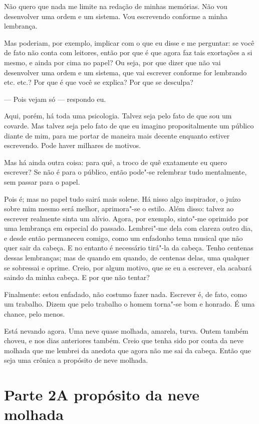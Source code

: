 Não quero que nada me limite na redação de minhas memórias. Não vou
desenvolver uma ordem e um sistema. Vou escrevendo conforme a minha lembrança.

Mas poderiam, por exemplo, implicar com o que eu disse e me perguntar:
se você de fato não conta com leitores, então por que é que agora faz
tais exortações a si mesmo, e ainda por cima no papel? Ou seja, por que
dizer que não vai desenvolver uma ordem e um sistema, que vai escrever
conforme for lembrando etc. etc.? Por que é que você se explica? Por que se
desculpa?

--- Pois vejam só --- respondo eu.

Aqui, porém, há toda uma psicologia. Talvez seja pelo fato de que sou um
covarde. Mas talvez seja pelo fato de que eu imagino propositalmente um
público diante de mim, para me portar de maneira mais decente enquanto
estiver escrevendo. Pode haver milhares de motivos.

Mas há ainda outra coisa: para quê, a troco de quê exatamente eu quero
escrever? Se não é para o público, então pode"-se relembrar tudo
mentalmente, sem passar para o papel.

Pois é; mas no papel tudo sairá mais solene. Há nisso algo inspirador, o
juízo sobre mim mesmo será melhor, aprimora"-se o estilo. Além disso:
talvez ao escrever realmente sinta um alívio. Agora, por exemplo,
sinto"-me oprimido por uma lembrança em especial do passado. Lembrei"-me
dela com clareza outro dia, e desde então permaneceu comigo, como um
enfadonho tema musical que não quer sair da cabeça. E no entanto é
necessário tirá"-la da cabeça. Tenho centenas dessas lembranças; mas de
quando em quando, de centenas delas, uma qualquer se sobressai e
oprime. Creio, por algum motivo, que se eu a escrever, ela acabará
saindo da minha cabeça. E por que não tentar?

Finalmente: estou enfadado, não costumo fazer nada. Escrever é, de fato,
como um trabalho. Dizem que pelo trabalho o homem torna"-se bom e
honrado. É uma chance, pelo menos.

Está nevando agora. Uma neve quase molhada, amarela, turva. Ontem também
choveu, e nos dias anteriores também. Creio que tenha sido por conta da
neve molhada que me lembrei da anedota que agora não me sai da cabeça.
Então que seja uma crônica a propósito de neve molhada.



\chapter[Parte 2 --- A propósito da neve molhada]{Parte 2\break A propósito da neve molhada}

